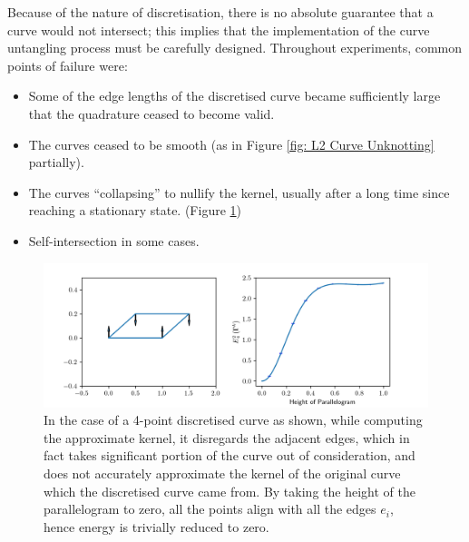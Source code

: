 \documentclass[../dissertation.tex]{subfiles}
\begin{document}
Because of the nature of discretisation, there is no absolute guarantee that a curve would not intersect;
this implies that the implementation of the curve untangling process must be carefully designed.
Throughout experiments, common points of failure were:
\begin{itemize}
    \item Some of the edge lengths of the discretised curve became sufficiently large that the quadrature ceased to become valid.
    \item The curves ceased to be smooth (as in Figure \ref{fig: L2 Curve Unknotting} partially).
    \item The curves ``collapsing'' to nullify the kernel, usually after a long time since reaching a stationary state.
        (Figure \ref{fig: Collapse})
    \item Self-intersection in some cases.
\end{itemize}
\begin{figure}[tbp]
    \centering
    \includegraphics[width=\textwidth]{sections/conclusionImgs/FailureCollapse}
    \caption{
        In the case of a 4-point discretised curve as shown, while computing the approximate kernel,
        it disregards the adjacent edges, which in fact takes significant portion of the curve out of consideration,
        and does not accurately approximate the kernel of the original curve which the discretised curve came from.
        By taking the height of the parallelogram to zero, all the points align with all the edges $e_i$,
        hence energy is trivially reduced to zero.
    }
    \label{fig: Collapse}
\end{figure}
\end{document}
